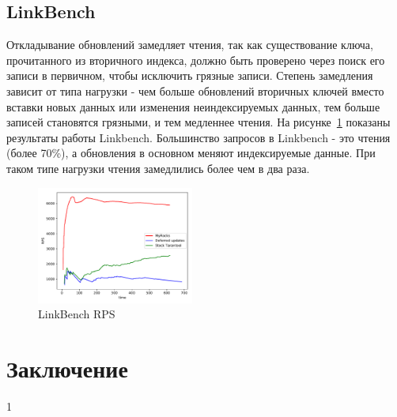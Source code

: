 \documentclass[a4paper,hidelinks,12pt]{article}
\begin{document}
\subsection{LinkBench}

Откладывание обновлений замедляет чтения, так как существование ключа,
прочитанного из вторичного индекса, должно быть проверено через поиск его записи
в первичном, чтобы исключить грязные записи. Степень замедления зависит от типа
нагрузки - чем больше обновлений вторичных ключей вместо вставки новых данных
или изменения неиндексируемых данных, тем больше записей становятся грязными,
и тем медленнее чтения. На рисунке~\ref{fig:linkbench} показаны результаты
работы Linkbench. Большинство запросов в Linkbench - это чтения (более 70\%), а
обновления в основном меняют индексируемые данные. При таком типе нагрузки
чтения замедлились более чем в два раза.

\begin{figure}
\centering
\includegraphics[width=0.46\textwidth]{linkbench}
\caption{LinkBench RPS}
\label{fig:linkbench}
\end{figure}

\section{Заключение}
1
\end{document}
